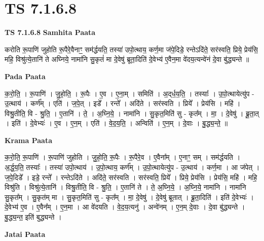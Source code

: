 \documentclass[17pt]{extarticle}
\begin{document}
\section{ TS 7.1.6.8 }

\textbf{TS 7.1.6.8 } \newline
\textbf{Samhita Paata} \newline

करोति रू॒पाणि॑ जुहोति रू॒पैरे॒वैनाꣳ॒॒ सम॑र्द्धयति॒ तस्या॑ उपो॒त्थाय॒ कर्ण॒मा ज॑पे॒दिडे॒ रन्तेऽदि॑ते॒ सर॑स्वति॒ प्रिये॒ प्रेय॑सि॒ महि॒ विश्रु॑त्ये॒तानि॑ ते अघ्निये॒ नामा॑नि सु॒कृतं॑ मा दे॒वेषु॑ ब्रूता॒दिति॑ दे॒वेभ्य॑ ए॒वैन॒मा वे॑दय॒त्यन्वे॑नं दे॒वा बु॑द्ध्यन्ते ॥ \newline

\textbf{Pada Paata} \newline

क॒रो॒ति॒ । रू॒पाणि॑ । जु॒हो॒ति॒ । रू॒पैः । ए॒व । ए॒ना॒म् । समिति॑ । अ॒द्‌र्ध॒य॒ति॒ । तस्याः᳚ ।      उ॒पो॒त्थायेत्यु॑प - उ॒त्थाय॑ । कर्ण᳚म् । एति॑ । ज॒पे॒त् । इडे᳚ । रन्ते᳚ । अदि॑ते । सर॑स्वति । प्रिये᳚ । प्रेय॑सि । महि॑ । विश्रु॒तीति॒ वि - श्रु॒ति॒ । ए॒तानि॑ । ते॒ । अ॒घ्नि॒ये॒ । नामा॑नि । सु॒कृत॒मिति॑ सु - कृत᳚म् । मा॒ । दे॒वेषु॑ । ब्रू॒ता॒त् । इति॑ । दे॒वेभ्यः॑ । ए॒व । ए॒न॒म् । एति॑ । वे॒द॒य॒ति॒ । अन्विति॑ । ए॒न॒म् । दे॒वाः । बु॒द्ध्य॒न्ते॒ ॥  \newline


\textbf{Krama Paata} \newline

क॒रो॒ति॒ रू॒पाणि॑ । रू॒पाणि॑ जुहोति । जु॒हो॒ति॒ रू॒पैः । रू॒पैरे॒व । ए॒वैना᳚म् । ए॒नाꣳ॒॒ सम् । सम॑र्द्धयति । अ॒र्द्ध॒य॒ति॒ तस्याः᳚ । तस्या॑ उपो॒त्थाय॑ । उ॒पो॒त्थाय॒ कर्ण᳚म् । उ॒पो॒त्थायेत्यु॑प - उ॒त्थाय॑ । कर्ण॒मा । आ ज॑पेत् । ज॒पे॒दिडे᳚ । इडे॒ रन्ते᳚ । रन्तेऽदि॑ते । अदि॑ते॒ सर॑स्वति । सर॑स्वति॒ प्रिये᳚ । प्रिये॒ प्रेय॑सि । प्रेय॑सि॒ महि॑ । महि॒ विश्रु॑ति । विश्रु॑त्ये॒तानि॑ । विश्रु॒तीति॒ वि - श्रु॒ति॒ । ए॒तानि॑ ते । ते॒ अ॒घ्नि॒ये॒ । अ॒घ्नि॒ये॒ नामा॑नि । नामा॑नि सु॒कृत᳚म् । सु॒कृत॑म् मा । सु॒कृत॒मिति॑ सु - कृत᳚म् । मा॒ दे॒वेषु॑ । दे॒वेषु॑ ब्रूतात् । ब्रू॒ता॒दिति॑ । इति॑ दे॒वेभ्यः॑ । दे॒वेभ्य॑ ए॒व । ए॒वैन᳚म् । ए॒न॒मा । आ वे॑दयति । वे॒द॒य॒त्यनु॑ । अन्वे॑नम् । ए॒न॒म् दे॒वाः । दे॒वा बु॑द्ध्यन्ते । बु॒द्ध्य॒न्त॒ इति॑ बुद्ध्यन्ते । \newline

\textbf{Jatai Paata} \newline
\end{document}
